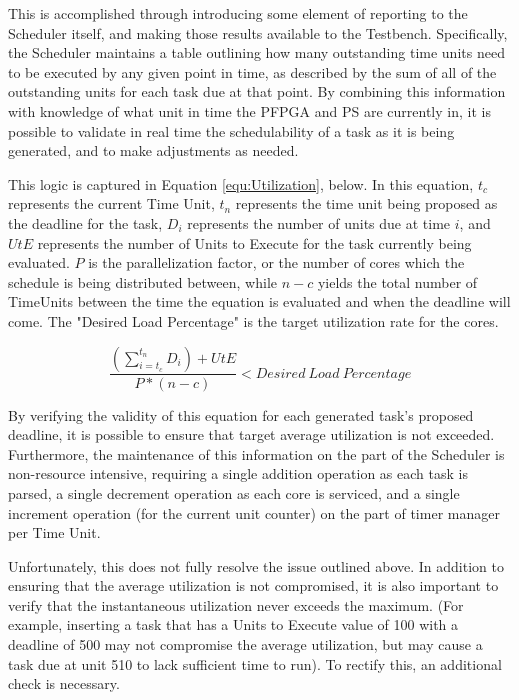 This is accomplished through introducing some element of reporting to the Scheduler itself, and making those results available to the Testbench. Specifically, the Scheduler maintains a table outlining how many outstanding time units need to be executed by any given point in time, as described by the sum of all of the outstanding units for each task due at that point. By combining this information with knowledge of what unit in time the PFPGA and PS are currently in, it is possible to validate in real time the schedulability of a task as it is being generated, and to make adjustments as needed. 

This logic is captured in Equation \ref{equ:Utilization}, below. In this equation, $t_c$ represents the current Time Unit, $t_n$ represents the time unit being proposed as the deadline for the task, $D_i$ represents the number of units due at time $i$, and $UtE$ represents the number of Units to Execute for the task currently being evaluated. $P$ is the parallelization factor, or the number of cores which the schedule is being distributed between, while $n-c$ yields the total number of TimeUnits between the time the equation is evaluated and when the deadline will come. The "Desired Load Percentage" is the target utilization rate for the cores.

\begin{equation}\label{equ:Utilization}
    \frac{(\sum_{i=t_c}^{t_n}D_i)+UtE}{P*(n-c)} < Desired\:Load\:Percentage
\end{equation}

By verifying the validity of this equation for each generated task's proposed deadline, it is possible to ensure that target average utilization is not exceeded. Furthermore, the maintenance of this information on the part of the Scheduler is non-resource intensive, requiring a single addition operation as each task is parsed, a single decrement operation as each core is serviced, and a single increment operation (for the current unit counter) on the part of timer manager per Time Unit.

Unfortunately, this does not fully resolve the issue outlined above. In addition to ensuring that the average utilization is not compromised, it is also important to verify that the instantaneous utilization never exceeds the maximum. (For example, inserting a task that has a Units to Execute value of 100 with a deadline of 500 may not compromise the average utilization, but may cause a task due at unit 510 to lack sufficient time to run). To rectify this, an additional check is necessary. 

